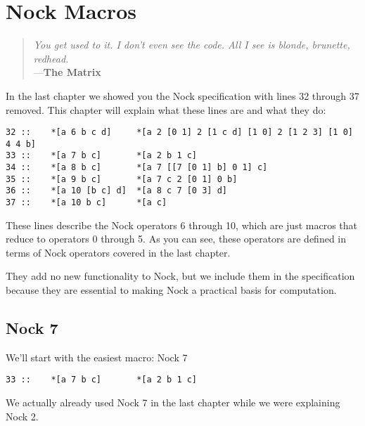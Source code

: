 \chapter{Nock Macros}

\begin{quote}
\noindent \emph{You get used to it. I don't even see the code.
All I see is blonde, brunette, redhead.}
\medskip \\
---\textbf{The Matrix}
\end{quote}

In the last chapter we showed you the Nock specification with lines 32 through 37 removed.
This chapter will explain what these lines are and what they do:

\begin{framed_shaded}
\begin{Verbatim}[fontsize=\relsize{-2.5},fontseries=b,commandchars=\\\{\}]
32 ::    *[a 6 b c d]     *[a 2 [0 1] 2 [1 c d] [1 0] 2 [1 2 3] [1 0] 4 4 b]
33 ::    *[a 7 b c]       *[a 2 b 1 c]
34 ::    *[a 8 b c]       *[a 7 [[7 [0 1] b] 0 1] c]
35 ::    *[a 9 b c]       *[a 7 c 2 [0 1] 0 b]
36 ::    *[a 10 [b c] d]  *[a 8 c 7 [0 3] d]
37 ::    *[a 10 b c]      *[a c]
\end{Verbatim}
\end{framed_shaded}

These lines describe the Nock operators 6 through 10, which are just macros that reduce to operators 0 through 5. As you can see, these operators are defined in terms of Nock operators covered in the last chapter.

They add no new functionality to Nock, but we include them in the specification because they are essential to making Nock a practical basis for computation.

\section{Nock 7}

We'll start with the easiest macro: Nock 7

\begin{framed_shaded}
\begin{Verbatim}[fontsize=\relsize{-2.5},fontseries=b,commandchars=\\\{\}]
33 ::    *[a 7 b c]       *[a 2 b 1 c]
\end{Verbatim}
\end{framed_shaded}
We actually already used Nock 7 in the last chapter while we were explaining Nock 2.


